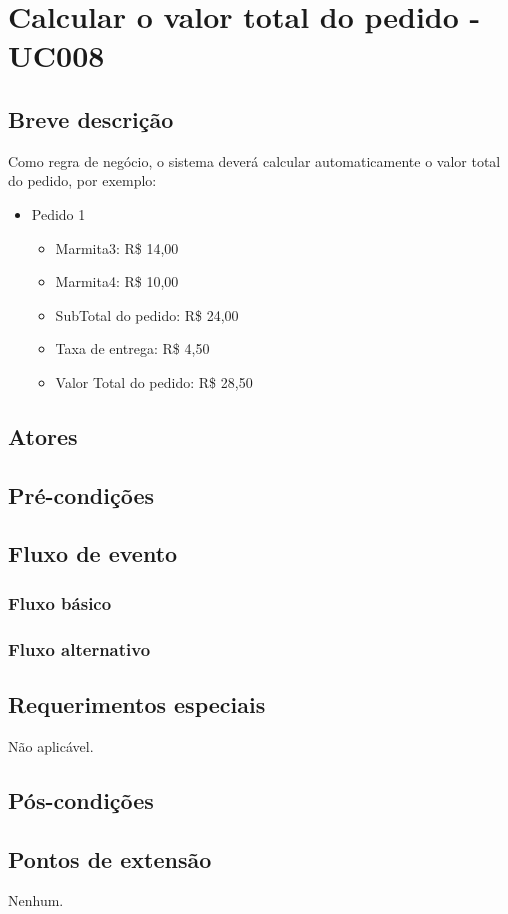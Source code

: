 \chapter{Calcular o valor total do pedido - UC008} \label{uc008}

\section{Breve descrição}

Como regra de negócio, o sistema deverá calcular automaticamente o valor total do pedido, por exemplo:

\begin{itemize}
	\item Pedido 1
	\begin{itemize}
		\item Marmita3: R\$ 14,00
		\item Marmita4: R\$ 10,00
		\item SubTotal do pedido: R\$ 24,00
		\item Taxa de entrega: R\$ 4,50
		\item Valor Total do pedido: R\$ 28,50
	\end{itemize}
\end{itemize}

\section{Atores}

\section{Pré-condições}

\section{Fluxo de evento}

\subsection{Fluxo básico}

\subsection{Fluxo alternativo}

\section{Requerimentos especiais}

Não aplicável.

\section{Pós-condições}

\section{Pontos de extensão}

Nenhum.